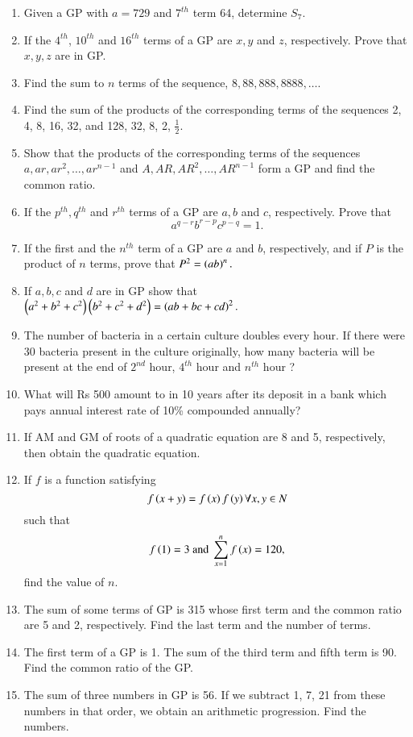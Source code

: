 \begin{enumerate}[label=\thesubsection.\arabic*.,ref=\thesubsection.\theenumi]
\item Given a GP  with $a = 729$ and $7^{th}$ term 64, determine $S_7$.
\item If the $4^{th}$, $10^{th}$ and $16^{th}$ terms of a GP  are $x, y$ and $z$, respectively. Prove that $x, y, z$ are in GP.
\item Find the sum to $n$ terms of the sequence, $8, 88, 888, 8888, \dots$. 
\item Find the sum of the products of the corresponding terms of the sequences 2, 4, 8, 16, 32, and 128, 32, 8, 2, $\frac{1}{2}$.
\item Show that the products of the corresponding terms of the sequences $a, ar, ar^2,\dots,  ar^{n-1}$ and $A, AR, AR^2,\dots,  AR^{n -1}$ form a GP  and find the common ratio.
\item If the $p^{th}, q^{th}$ and $r^{th}$ terms of a GP  are $a, b$ and $c$, respectively. Prove that 
$$a^{q-r} b^{r-p} c^{p-q} = 1.$$
\item If the first and the $n^{th}$ term of a GP  are $a$ and $b$, respectively, and if $P$ is the product of $n$ terms, prove that $P^2 = \left(ab\right)^n.$
\item If $a, b, c$ and $d$ are in GP  show that $\left(a^2 + b^2 + c^2\right)\left(b^2 + c^2 + d^2\right) = \left(ab + bc + cd\right)^2.$
\item The number of bacteria in a certain culture doubles every hour. If there were 30 bacteria present in the culture originally, how many bacteria will be present at the end of $2^{nd}$ hour, 
$4^{th}$ hour and $n^{th}$ hour ?
\item What will Rs 500 amount to in 10 years after its deposit in a bank which pays annual interest rate of 10\% compounded annually?
\item If AM  and GM  of roots of a quadratic equation are 8 and 5, respectively, then obtain the quadratic equation.
\item If $f$ is a function satisfying $$f\left(x +y\right) = f\left(x\right) f\left(y\right) \forall x,y \in N$$ such that 
	$$f\left(1\right) = 3\text{ and }\sum_{x = 1}^n f\left(x\right) = 120,$$ find the value of $n$.
\item The sum of some terms of GP  is 315 whose first term and the common ratio are 5 and 2, respectively. Find the last term and the number of terms.
\item  The first term of a GP  is 1. The sum of the third term and fifth term is 90. Find the common ratio of the GP.
\item The sum of three numbers in GP  is 56. If we subtract 1, 7, 21 from these numbers in that order, we obtain an arithmetic progression. Find the numbers.

\end{enumerate}
